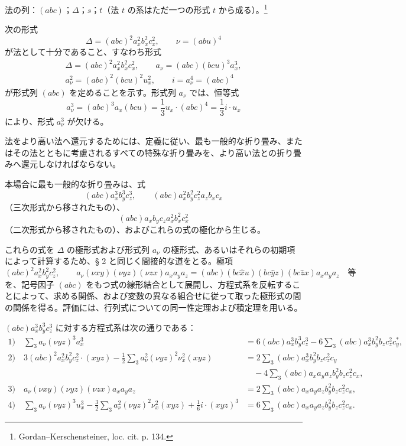 \documentclass[11pt]{jlreq}
\newcommand{\A}{\Delta}
\begin{document}
法の列：$(abc)$；$\A$；$s$；$t$（法 $t$ の系はただ一つの形式 $t$ から成る）。\footnote{Gordan--Kerschensteiner, loc. cit. p. 134.}

次の形式
\[
\A=(abc)^2a_x^2b_x^2c_x^2,\qquad \nu=(abu)^4
\]
が法として十分であること、すなわち形式
\[
\begin{gathered}
\A=(abc)^2a_x^2b_x^2c_x^2,\qquad
a_\nu=(abc)(bcu)^3a_x^3,\\
a_\nu^2=(abc)^2(bcu)^2u_x^2,\qquad
i=a_\nu^4=(abc)^4
\end{gathered}
\]
が形式列 $(abc)$ を定めることを示す。形式列 $a_\nu$ では、恒等式
\[
a_\nu^3=(abc)^3a_x(bcu)=\frac13 u_x\cdot(abc)^4=\frac13 i\cdot u_x
\]
により、形式 $a_\nu^3$ が欠ける。

法をより高い法へ還元するためには、定義に従い、最も一般的な折り畳み、またはその法とともに考慮されるすべての特殊な折り畳みを、より高い法との折り畳みへ還元しなければならない。

本場合に最も一般的な折り畳みは、式
\[
(abc)a_x^3b_y^3c_z^3,\qquad
(abc)a_x^2b_y^2c_z^2a_zb_xc_x
\]
（三次形式から移されたもの）、
\[
(abc)a_xb_yc_za_x^2b_x^2c_x^2
\]
（二次形式から移されたもの）、およびこれらの式の極化から生じる。

これらの式を $\A$ の極形式および形式列 $a_\nu$ の極形式、あるいはそれらの初期項によって計算するため、§ 2 と同じく間接的な道をとる。極項
\[
(abc)^2a_x^2b_y^2c_z^2,\qquad
a_\nu(\nu xy)(\nu yz)(\nu zx)a_xa_ya_z
=(abc)(bc\widehat{x}u)(bc\widehat{y}z)(bc\widehat{z}x)a_xa_ya_z\quad\text{等}
\]
を、記号因子 $(abc)$ をもつ式の線形結合として展開し、方程式系を反転することによって、求める関係、および変数の異なる組合せに従って取った極形式の間の関係を得る。評価には、行列式についての同一性定理および積定理を用いる。

$(abc)a_x^3b_y^3c_z^3$ に対する方程式系は次の通りである：
\begingroup\small
\[
\begin{aligned}
1)\quad
\sum_3 a_\nu(\nu yz)^3a_x^3
&=6(abc)a_x^3b_y^3c_z^3
-6\sum_3(abc)a_x^3b_y^2b_zc_z^2c_y^{*},\\[0.4em]
2)\quad
3(abc)^2a_x^2b_y^2c_z^2\cdot(xyz)
-\frac12\sum_3 a_\nu^2(\nu yz)^2\nu_x^2(xyz)
&=2\sum_3(abc)a_x^3b_y^2b_zc_z^2c_y\\
&\quad-4\sum_3(abc)a_xa_ya_zb_y^2b_zc_z^2c_x,\\[0.4em]
3)\quad
a_\nu(\nu xy)(\nu yz)(\nu zx)a_xa_ya_z
&=2\sum_3(abc)a_xa_ya_zb_y^2b_zc_z^2c_x,\\[0.4em]
4)\quad
\sum_3 a_\nu(\nu yz)^3u_x^3
-\frac32\sum_3 a_\nu^2(\nu yz)^2\nu_x^2(xyz)
+\frac16 i\cdot(xyz)^3
&=6\sum_3(abc)a_xa_ya_zb_y^2b_zc_z^2c_x.
\end{aligned}
\]
\endgroup
\end{document}

